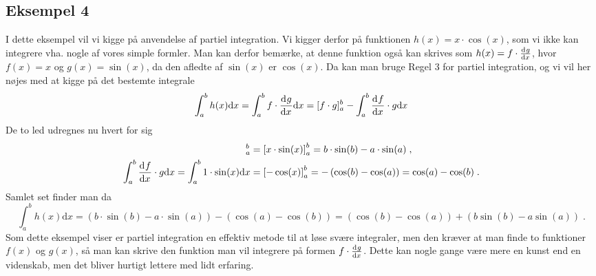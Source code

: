 \subsection{Eksempel 4}
I dette eksempel vil vi kigge på anvendelse af partiel integration. Vi kigger derfor på funktionen $h(x) = x \cdot \cos(x)$, som vi ikke kan integrere vha. nogle af vores simple formler. Man kan derfor bemærke, at denne funktion også kan skrives som $h(x) = f \cdot \dif{x}{g}$, hvor $f(x) = x$ og $g(x) = \sin(x)$, da den afledte af $\sin(x)$ er $\cos(x)$. Da kan man bruge Regel 3 for partiel integration, og vi vil her nøjes med at kigge på det bestemte integrale
\begin{equation*}
\int_a^b h(x) \text{d}x = \int_a^b f \cdot \dif{x}{g} \text{d}x = [f \cdot g]_a^b - \int_a^b \dif{x}{f} \cdot g \text{d}x 
\end{equation*}
De to led udregnes nu hvert for sig
\begin{align}
[f \cdot g]_a^b &= \left[ x \cdot \sin(x) \right]_a^b = b \cdot \sin(b) - a \cdot \sin(a) \; , \\
\int_a^b \dif{x}{f} \cdot g \text{d}x = \int_a^b 1 \cdot \sin(x) \text{d}x &= \left[ -\cos(x)  \right]_a^b = - \left( \cos(b) - \cos(a) \right) = \cos(a) - \cos(b) \; . 
\end{align}
Samlet set finder man da
\begin{equation*}
\int_a^b h(x) \text{d}x = \left( b \cdot \sin(b) - a \cdot \sin(a) \right) - \left( \cos(a) - \cos(b) \right) = \left( \cos(b) - \cos(a) \right) +  \left( b\sin(b) - a \sin(a) \right)  \; . 
\end{equation*}
Som dette eksempel viser er partiel integration en effektiv metode til at løse svære integraler, men den kræver at man finde to funktioner $f(x)$ og $g(x)$, så man kan skrive den funktion man vil integrere på formen $f \cdot \dif{x}{g}$. Dette kan nogle gange være mere en kunst end en videnskab, men det bliver hurtigt lettere med lidt erfaring.

